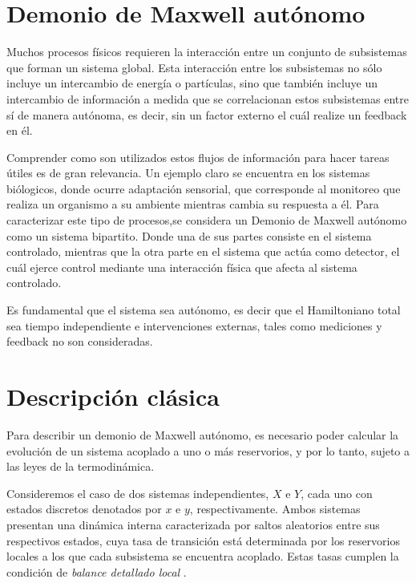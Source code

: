 
\label{sec4:Demon}

\section{Demonio de Maxwell autónomo}
Muchos procesos físicos requieren la interacción entre un conjunto de subsistemas que forman un sistema global. Esta interacción entre los subsistemas no sólo incluye un intercambio de energía o partículas, sino que también incluye un intercambio de información a medida que se correlacionan estos subsistemas entre sí de manera autónoma, es decir, sin un factor externo el cuál realize un feedback en él.

Comprender como son utilizados estos flujos de información para hacer tareas útiles es de gran relevancia. Un ejemplo claro se encuentra en los sistemas biólogicos, donde ocurre adaptación sensorial, que corresponde al monitoreo que realiza un organismo a su ambiente mientras cambia su respuesta a él\cite{lan2012energy}. Para caracterizar este tipo de procesos,se considera un Demonio de Maxwell autónomo como un sistema bipartito. Donde una de sus partes consiste en el sistema controlado, mientras que la otra parte en el sistema que actúa como detector, el cuál ejerce control mediante una interacción física que afecta al sistema controlado.

Es fundamental que el sistema sea autónomo, es decir que el Hamiltoniano total sea tiempo independiente e intervenciones externas, tales como mediciones y feedback no son consideradas.

\label{sec4:autonomo}
\section{Descripción clásica}
Para describir un demonio de Maxwell autónomo, es necesario poder calcular la evolución de un sistema acoplado a uno o más reservorios, y por lo tanto, sujeto a las leyes de la termodinámica. 

Consideremos el caso de dos sistemas independientes, \( X \) e \( Y \), cada uno con estados discretos denotados por \( x \) e \( y \), respectivamente. Ambos sistemas presentan una dinámica interna caracterizada por saltos aleatorios entre sus respectivos estados, cuya tasa de transición está determinada por los reservorios locales a los que cada subsistema se encuentra acoplado. Estas tasas cumplen la condición de \textit{balance detallado local} \cite{van2015ensemble}.

